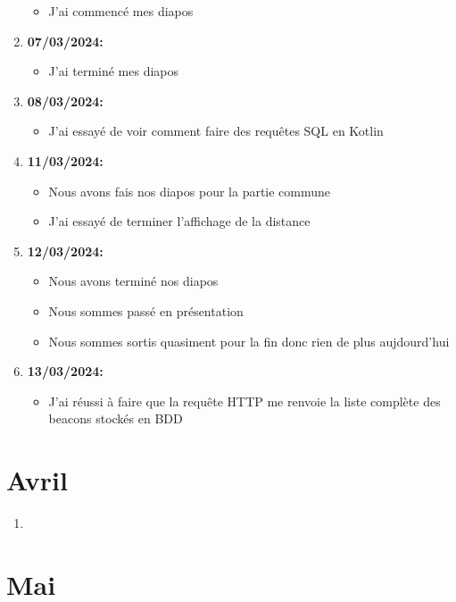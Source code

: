 \documentclass[10pt,a4paper]{book}
\begin{document}
\begin{enumerate}
\begin{itemize}
            \item J'ai commencé mes diapos
        \end{itemize}
    \item \textbf{07/03/2024:}
        \begin{itemize}
            \item J'ai terminé mes diapos
        \end{itemize}
    \item \textbf{08/03/2024:}
        \begin{itemize}
            \item J'ai essayé de voir comment faire des requêtes SQL en Kotlin
        \end{itemize}
    \item \textbf{11/03/2024:}
        \begin{itemize}
            \item Nous avons fais nos diapos pour la partie commune
            \item J'ai essayé de terminer l'affichage de la distance
        \end{itemize}
    \item \textbf{12/03/2024:}
        \begin{itemize}
            \item Nous avons terminé nos diapos
            \item Nous sommes passé en présentation
            \item Nous sommes sortis quasiment pour la fin donc rien de plus aujdourd'hui
        \end{itemize}
    \item \textbf{13/03/2024:}
        \begin{itemize}
            \item J'ai réussi à faire que la requête HTTP me renvoie la liste complète des beacons stockés en BDD
        \end{itemize}
\end{enumerate}

\chapter{Avril}

\begin{enumerate}
    \item 
\end{enumerate}

\chapter{Mai}
\end{document}
